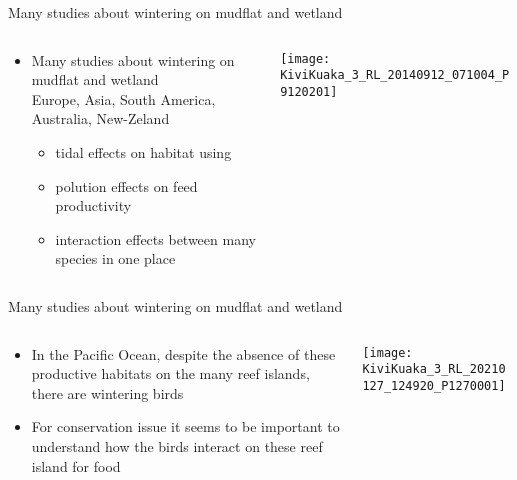 \documentclass[10pt,compress]{beamer}
\begin{document}
\begin{frame}{Many studies about wintering on mudflat and wetland }
  \begin{columns}
    \begin{column}[c]{0.55\textwidth}
      \begin{itemize}[<+->]
      \item Many studies about wintering on mudflat and wetland \\
        {\footnotesize Europe, Asia, South America, Australia,
          New-Zeland}
        \begin{itemize}
        \item tidal effects on habitat using
        \item polution effects on feed productivity
        \item interaction effects between many species in one place
        \end{itemize}
      \end{itemize}
    \end{column}
    \begin{column}[c]{0.45\textwidth}
      \texttt{[image: KiviKuaka\_3\_RL\_20140912\_071004\_P9120201]}
      \end{column}
  \end{columns}
\end{frame}

\begin{frame}{Many studies about wintering on mudflat and wetland }
  \begin{columns}
    \begin{column}[c]{0.55\textwidth}
      \begin{itemize}[<+->]
      \item In the Pacific Ocean, despite the absence of these productive habitats on the many reef islands, there are wintering birds
      \item For conservation issue it seems to be important to
        understand how the birds interact on these reef island for food
       \end{itemize}
    \end{column}
    \begin{column}[c]{0.45\textwidth}
      \texttt{[image: KiviKuaka\_3\_RL\_20210127\_124920\_P1270001]}
     \end{column}
  \end{columns}
\end{frame}
\end{document}
